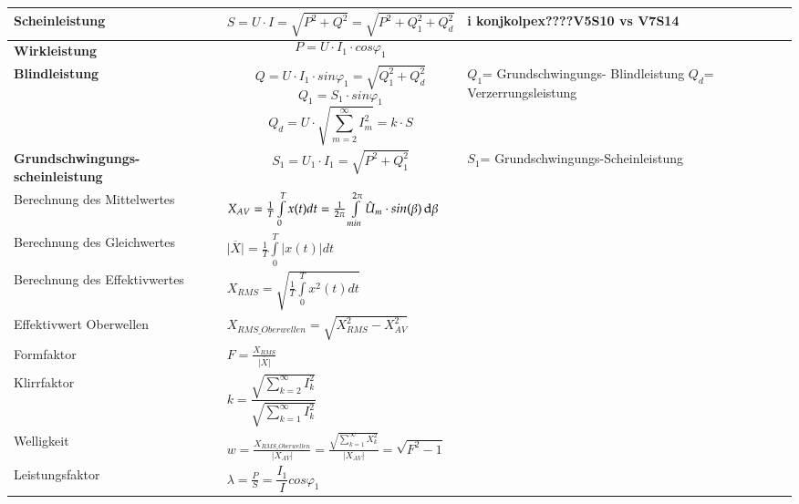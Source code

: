\begin{longtable}{| p{} | p{} |p{}|}
    \hline
    
    \textbf{{\color{blue}Scheinleistung}}&
    \vspace{-0.5cm}\[ S=U\cdot I =  \sqrt{P^2+Q^2} = \sqrt{P^2+Q_1^2+Q_d^2} \]\vspace{-0.5cm}&\textbf{i konjkolpex????}\newline V5S10 vs V7S14
    \\ \hline
    
    \textbf{Wirkleistung}&
    \vspace{-0.5cm}\[ P=U\cdot I_1 \cdot cos\varphi_1 \]\vspace{-0.5cm}&
    \\ \hline 
       
    \textbf{\color{yellow}Blindleistung}&
    \vspace{-0.5cm}\[ Q=U\cdot I_1 \cdot sin\varphi_1 = \sqrt{Q_1^2+Q_d^2} \]
    \[ Q_1 = S_1 \cdot sin \varphi_1 \]
    \[ Q_d = U\cdot \sqrt{\sum_{m=2}^{\infty}I_m^2}  = k \cdot S \]\vspace{-0.2cm}&
    $ Q_1 $= Grundschwingungs- \newline \quad Blindleistung\newline
    $ Q_d $= Verzerrungsleistung\newline
    \\ \hline
      
    \textbf{\color{green}Grundschwingungs-\newline scheinleistung}&
    \vspace{-0.5cm}\[ S_1=U_1\cdot I_1 = \sqrt{P^2+Q_1^2}\]\vspace{-0.5cm}&
    $ S_1 $= Grundschwingungs-Scheinleistung
    \\ \hline    
    \hline
    Berechnung des Mittelwertes&
    $X_{AV} = \frac{1}{T}\int\limits_{0}^{T}x(t)dt = \frac{1}{2\pi}\int\limits_{min}^{2\pi}\hat{U}_m\cdot sin(\beta)\mathop{}\!\mathrm{d} \beta$
    &\\
    \hline
    Berechnung des Gleichwertes
    & $\overline{|X|} = \frac{1}{T} \int\limits_{0}^{T} |x(t)|dt$
    &\\
    \hline
    Berechnung des Effektivwertes
    & $X_{RMS} = \sqrt{\frac{1}{T}\int\limits_{0}^{T}x^2(t)dt}$
    &\\
    \hline
    Effektivwert Oberwellen
    & $X_{RMS\_Oberwellen} = \sqrt{X_{RMS}^2 - X_{AV}^2}$
    &\\
    \hline
    Formfaktor
    & $F = \frac{X_{RMS}}{\overline{|X|}}$
    &\\
    \hline
    Klirrfaktor
    &$ k= \dfrac{\sqrt{\sum_{k=2}^{\infty} I_k^2}}{\sqrt{\sum_{k=1}^{\infty} I_k^2}}$
    &\\
    \hline
    Welligkeit
    & $w = \frac{X_{RMS\_Oberwellen}}{|X_{AV}|}= \frac{\sqrt{\sum\limits_{k = 1}^{\infty}X_{k}^2}}{|X_{AV}|} = \sqrt{F^2-1}$
    &\\
    \hline
    Leistungsfaktor&
    $ \lambda = \frac{P}{S} = \dfrac{I_1}{I}cos\varphi_1 $
    & \\ \hline 
\end{longtable}
\clearpage

